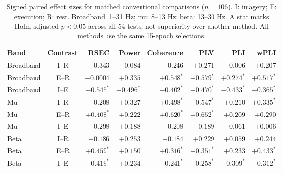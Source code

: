 \begin{table}[!t]
\centering
\caption{Signed paired effect sizes for matched conventional comparisons ($n=106$). I: imagery; E: execution; R: rest. Broadband: 1--31 Hz; mu: 8--13 Hz; beta: 13--30 Hz. A star marks Holm-adjusted $p<0.05$ across all 54 tests, not superiority over another method. All methods use the same 15-epoch selections.}
\label{tab:comparisons}
\small
\setlength{\tabcolsep}{6pt}
\renewcommand{\arraystretch}{1.15}
\begin{tabular}{|l|c|r|r|r|r|r|r|}
\hline
\rowcolor{light-gray}
\textbf{Band} & \textbf{Contrast} & \textbf{RSEC} & \textbf{Power} & \textbf{Coherence} & \textbf{PLV} & \textbf{PLI} & \textbf{wPLI} \\ \hline
Broadband & I--R & $-0.343$ & $-0.084$ & $+0.246$ & $+0.271$ & $-0.006$ & $+0.207$ \\ \hline
Broadband & E--R & $-0.0004$ & $+0.335$ & $+0.548^{*}$ & $+0.579^{*}$ & $+0.274^{*}$ & $+0.517^{*}$ \\ \hline
Broadband & I--E & $-0.545^{*}$ & $-0.496^{*}$ & $-0.402^{*}$ & $-0.470^{*}$ & $-0.433^{*}$ & $-0.365^{*}$ \\ \hline
Mu & I--R & $+0.208$ & $+0.327$ & $+0.498^{*}$ & $+0.547^{*}$ & $+0.210$ & $+0.335^{*}$ \\ \hline
Mu & E--R & $+0.408^{*}$ & $+0.222$ & $+0.620^{*}$ & $+0.652^{*}$ & $+0.209$ & $+0.290$ \\ \hline
Mu & I--E & $-0.298$ & $+0.188$ & $-0.208$ & $-0.189$ & $-0.061$ & $+0.006$ \\ \hline
Beta & I--R & $+0.186$ & $+0.253$ & $+0.184$ & $+0.229$ & $+0.059$ & $+0.244$ \\ \hline
Beta & E--R & $+0.459^{*}$ & $+0.150$ & $+0.316^{*}$ & $+0.351^{*}$ & $+0.233$ & $+0.433^{*}$ \\ \hline
Beta & I--E & $-0.419^{*}$ & $+0.234$ & $-0.241^{*}$ & $-0.258^{*}$ & $-0.309^{*}$ & $-0.312^{*}$ \\ \hline
\end{tabular}
\end{table}
